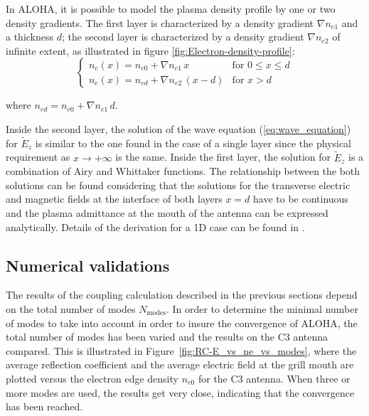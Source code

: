In ALOHA, it is possible to model the plasma density profile by one or two density gradients. The first layer is characterized by a density gradient $\nabla n_{e1}$ and a thickness $d$; the second layer is characterized by a density gradient $\nabla n_{e2}$ of infinite extent, as illustrated in figure \ref{fig:Electron-density-profile}: 
\begin{equation}
\left\{ 
\begin{array}{ll}
n_{e}\left(x\right)=n_{e0}+\nabla n_{e1}\, x & \mbox{for } 0\leq x\leq d\\
n_{e}\left(x\right)=n_{ed}+\nabla n_{e2}\,\left(x-d\right) & \mbox{for }  x>d
\end{array}
\right.
\label{eq:density_profile}
\end{equation}

where $n_{ed}=n_{e0}+\nabla n_{e1}\, d$.


Inside the second layer, the solution of the wave equation (\ref{eq:wave_equation}) for $\tilde{E}_{z}$ is similar to the one found in the case of a single layer since the physical requirement as $x\rightarrow+\infty$ is the same. Inside the first layer, the solution for $\tilde{E}_{z}$ is a combination of Airy and Whittaker functions. The relationship between the both solutions can be found considering that the solutions for the transverse electric and magnetic fields at the interface of both layers $x=d$ have to be continuous and the plasma admittance at the mouth of the antenna can be expressed analytically. Details of the derivation for a 1D case can be found in .


\subsection{Numerical validations}\label{sec:numerical_considerations}

The results of the coupling calculation described in the previous sections depend on the total number of modes $N_{\mbox{modes}}$. In order to determine the minimal number of modes to take into account in order to insure the convergence of ALOHA, the total number of modes has been varied and the results on the C3 antenna compared. This is illustrated in Figure~\ref{fig:RC-E_vs_ne_vs_modes}, where the average reflection coefficient and the average electric field at the grill mouth are plotted versus the electron edge density $n_{e0}$ for the C3 antenna. When three or more modes are used, the results get very
close, indicating that the convergence has been reached. 

